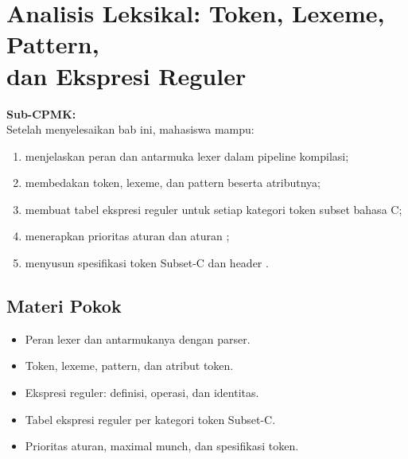\documentclass[../../main.tex]{subfiles}
\begin{document}
\chapter[Analisis Leksikal]{Analisis Leksikal: Token, Lexeme, Pattern,\\ dan Ekspresi Reguler}
\label{chap:leksikal}

\begin{outcomebox}
\textbf{Sub-CPMK:} \\[3pt]
Setelah menyelesaikan bab ini, mahasiswa mampu:
\begin{enumerate}[label=\arabic*.,leftmargin=*]
  \item menjelaskan peran dan antarmuka lexer dalam pipeline
        kompilasi;
  \item membedakan token, lexeme, dan pattern beserta atributnya;
  \item membuat tabel ekspresi reguler untuk setiap kategori token
        subset bahasa C;
  \item menerapkan prioritas aturan dan aturan ;
  \item menyusun spesifikasi token Subset-C dan header .
\end{enumerate}
\end{outcomebox}

\section*{Materi Pokok}
\begin{itemize}[leftmargin=*]
  \item Peran lexer dan antarmukanya dengan parser.
  \item Token, lexeme, pattern, dan atribut token.
  \item Ekspresi reguler: definisi, operasi, dan identitas.
  \item Tabel ekspresi reguler per kategori token Subset-C.
  \item Prioritas aturan, maximal munch, dan spesifikasi token.
\end{itemize}















\ifSubfilesClassLoaded{%
}{}
\end{document}
